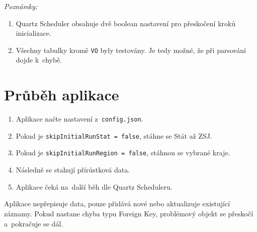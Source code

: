 \textit{Poznámky:}
\begin{enumerate}
  \item Quartz Scheduler obsahuje dvě boolean nastavení pro přeskočení kroků inicializace.
  \item Všechny tabulky kromě \texttt{VO} byly testovány. Je tedy možné, že při parsování dojde k~chybě.
\end{enumerate}

\section*{Průběh aplikace}
\begin{enumerate}
  \item Aplikace načte nastavení z~\texttt{config.json}.
  \item Pokud je \texttt{skipInitialRunStat = false}, stáhne se Stát až ZSJ.
  \item Pokud je \texttt{skipInitialRunRegion = false}, stáhnou se vybrané kraje.
  \item Následně se stahují přírůstková data.
  \item Aplikace čeká na~další běh dle Quartz Scheduleru.
\end{enumerate}

Aplikace nepřepisuje data, pouze přidává nové nebo aktualizuje existující záznamy.
Pokud nastane chyba typu Foreign Key, problémový objekt se přeskočí a~pokračuje se dál.
